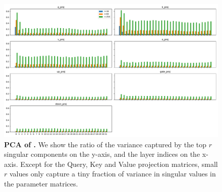 \begin{figure}[!h]
    \centering
    \includegraphics[width=\textwidth]{images/pca_analysis_mistral-7b.pdf}
    \vspace{-6mm}
    \caption{\textbf{PCA of \mistral.} We show the ratio of the variance captured by the top $r$ singular components on the y-axis, and the layer indices on the x-axis. Except for the Query, Key and Value projection matrices, small $r$ values only capture a tiny fraction of variance in singular values in the parameter matrices.}
    \vspace{-4mm}
    \label{fig:pca_analysis_mistral_7b}
\end{figure}